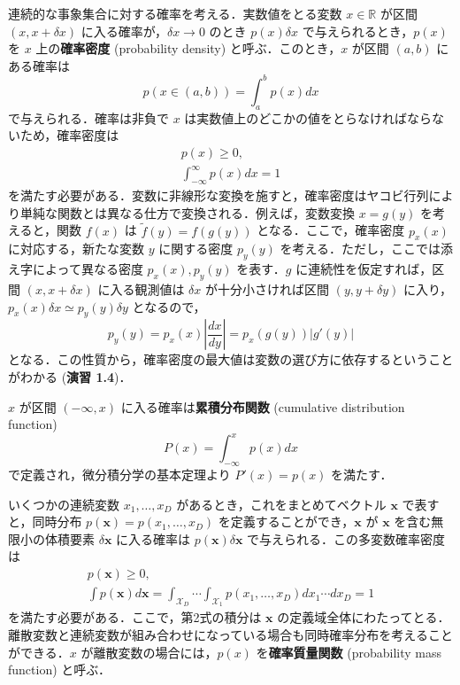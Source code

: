 \documentclass[uplatex,a4paper,oneside,openany,dvipdfmx]{jsarticle}
\numberwithin{equation}{section}
\theoremstyle{mystyle} %
\newcommand{\BR}{\mathbb{R}}
\newcommand{\CX}{\mathcal{X}}
\newcommand{\tb}[1]{\textbf{#1}}
\newcommand{\bs}[1]{\boldsymbol{#1}}
\begin{document}
連続的な事象集合に対する確率を考える．実数値をとる変数 $x \in \BR$ が区間 $(x,x + \delta x)$ に入る確率が，$\delta x \rightarrow 0$ のとき $p(x) \delta x$ で与えられるとき，$p(x)$ を $x$ 上の\tb{確率密度} (probability density) と呼ぶ．このとき，$x$ が区間 $(a,b)$ にある確率は
\begin{equation} \label{eq:1.24}
    p(x \in (a,b)) = \int_{a}^{b} p(x) dx
\end{equation}
で与えられる．確率は非負で $x$ は実数値上のどこかの値をとらなければならないため，確率密度は
\begin{gather}
    p(x) \ge 0,\\
    \int_{-\infty}^{\infty} p(x) dx = 1
\end{gather}
を満たす必要がある．変数に非線形な変換を施すと，確率密度はヤコビ行列により単純な関数とは異なる仕方で変換される．例えば，変数変換 $x=g(y)$ を考えると，関数 $f(x)$ は $\widetilde{f}(y)=f(g(y))$ となる．ここで，確率密度 $p_{x}(x)$ に対応する，新たな変数 $y$ に関する密度 $p_{y}(y)$ を考える．ただし，ここでは添え字によって異なる密度 $p_{x}(x),p_{y}(y)$ を表す．$g$ に連続性を仮定すれば，区間 $(x,x + \delta x)$ に入る観測値は $\delta x$ が十分小さければ区間 $(y,y + \delta y)$ に入り，$p_{x}(x) \delta x \simeq p_{y}(y) \delta y$ となるので，
\begin{equation} \label{eq:1.27}
    p_{y}(y) = p_{x}(x) \left|\frac{dx}{dy}\right| = p_{x}(g(y))|g'(y)|
\end{equation}
となる．この性質から，確率密度の最大値は変数の選び方に依存するということがわかる (\tb{演習 1.4})．

$x$ が区間 $(-\infty,x)$ に入る確率は\tb{累積分布関数} (cumulative distribution function)
\begin{equation} \label{eq:1.28}
    P(x) = \int_{-\infty}^{x} p(x) dx
\end{equation}
で定義され，微分積分学の基本定理より $P'(x) = p(x)$ を満たす．

いくつかの連続変数 $x_{1},\ldots,x_{D}$ があるとき，これをまとめてベクトル $\bs{x}$ で表すと，同時分布 $p(\bs{x}) = p(x_{1},\ldots,x_{D})$ を定義することができ，$\bs{x}$ が $\bs{x}$ を含む無限小の体積要素 $\delta \bs{x}$ に入る確率は $p(\bs{x})\delta\bs{x}$ で与えられる．この多変数確率密度は
\begin{gather}
    p(\bs{x}) \ge 0,\\
    \int p(\bs{x}) d\bs{x} = \int_{\CX_{D}} \cdots \int_{\CX_{1}} p(x_{1},\ldots,x_{D}) dx_{1} \cdots dx_{D} =  1
\end{gather}
を満たす必要がある．ここで，第2式の積分は $\bs{x}$ の定義域全体にわたってとる．離散変数と連続変数が組み合わせになっている場合も同時確率分布を考えることができる．$x$ が離散変数の場合には，$p(x)$ を\tb{確率質量関数} (probability mass function) と呼ぶ．
\end{document}

